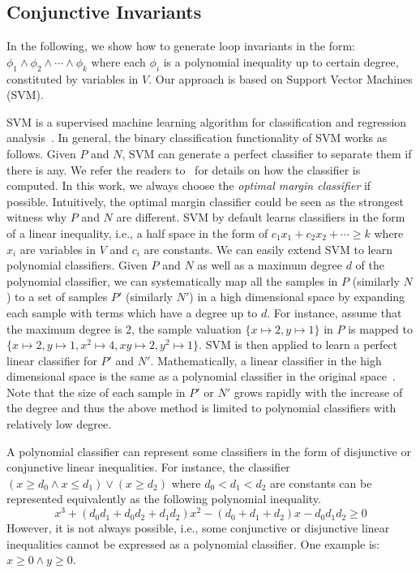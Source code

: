 \subsection{Conjunctive Invariants} \label{existing}
In the following, we show how to generate loop invariants in the form: $\phi_1 \land \phi_2 \land \cdots \land \phi_k$ where each $\phi_i$ is a polynomial inequality up to certain degree, constituted by variables in $V$. Our approach is based on Support Vector Machines (SVM).

SVM is a supervised machine learning algorithm for classification and regression analysis~\cite{svm:original}.
In general, the binary classification functionality of SVM works as follows. Given $P$ and $N$, SVM can generate a perfect classifier to separate them if there is any.
We refer the readers to~\cite{svm:smo} for details on how the classifier is computed. In this work, we always choose the \textit{optimal margin classifier} if possible. Intuitively, the optimal margin classifier could be seen as the strongest witness why $P$ and $N$ are different.
SVM by default learns classifiers in the form of a linear inequality, i.e., a half space in the form of $c_1x_1 + c_2x_2 + \cdots \geq k$ where $x_i$ are variables in $V$ and $c_i$ are constants.
We can easily extend SVM to learn polynomial classifiers. Given $P$ and $N$ as well as a maximum degree $d$ of the polynomial classifier, we can systematically map all the samples in $P$ (similarly $N$) to a set of samples $P'$ (similarly $N'$) in a high dimensional space by expanding each sample with terms which have a degree up to $d$. For instance, assume that the maximum degree is 2, the sample valuation $\{ x \mapsto 2, y \mapsto 1\}$ in $P$ is mapped to $\{x \mapsto 2, y \mapsto 1, x^2 \mapsto 4, xy \mapsto 2, y^2 \mapsto 1\}$.
SVM is then applied to learn a perfect linear classifier for $P'$ and $N'$. Mathematically, a linear classifier in the high dimensional space is the same as a polynomial classifier in the original space~\cite{svm:kernel}.
Note that the size of each sample in $P'$ or $N'$ grows rapidly with the increase of the degree and thus the above method is limited to polynomial classifiers with relatively low degree.

A polynomial classifier can represent some classifiers in the form of disjunctive or conjunctive linear inequalities. For instance, the classifier $(x \ge d_0 \wedge x \le d_1) \vee (x \ge d_2)$
where $d_0 < d_1 < d_2$ are constants can be represented equivalently as the following polynomial inequality.
\[
x^3 + (d_0d_1 + d_0d_2 + d_1d_2)x^2 - (d_0 + d_1 + d_2)x - d_0d_1d_2 \geq 0
\]
However, it is not always possible, i.e., some conjunctive or disjunctive linear inequalities cannot be expressed as a polynomial classifier. One example is: $x \ge 0 \land y \ge 0$.

